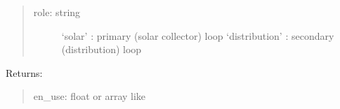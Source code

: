 \documentclass[letterpaper,10pt,english,openany]{sphinxmanual}
\begin{document}
\begin{fulllineitems}
\begin{fulllineitems}
\begin{quote}
\begin{description}
\item[{role: string}] \leavevmode
‘solar’ : primary (solar collector) loop
‘distribution’ : secondary (distribution) loop

\end{description}
\end{quote}

Returns:
\begin{quote}

en\_use: float or array like
\end{quote}

\end{fulllineitems}


\begin{fulllineitems}
\label{\detokenize{source/mswh.system:mswh.system.components.Distribution.size}}
\end{fulllineitems}


\end{fulllineitems}

\end{document}
